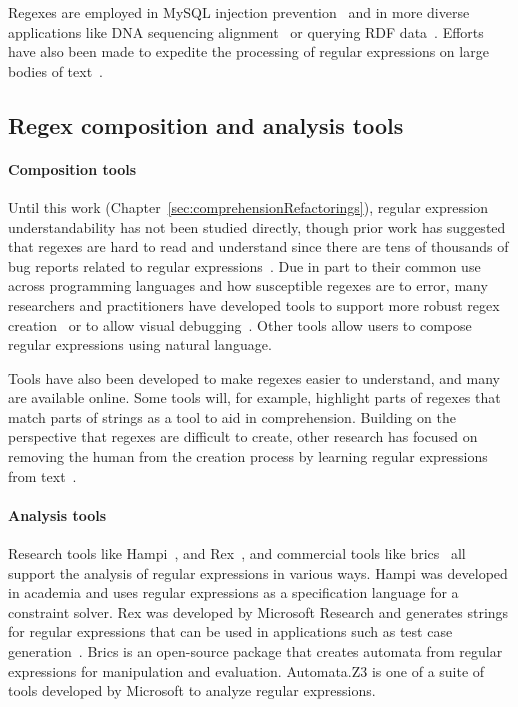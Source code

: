Regexes are employed in MySQL injection prevention~\cite{Yeole:2011:ADT:1980022.1980229} and in more diverse applications like DNA sequencing alignment~\cite{1594922} or querying RDF data~\cite{Lee:2010:PSQ:1871871.1871877, Alkhateeb:2009:ESR:1540656.1540975}.  Efforts have also been made to expedite the processing of regular expressions on large bodies of text~\cite{Baeza-Yates:1996:FTS:235809.235810}.

\subsection{Regex composition and analysis tools}
\paragraph{Composition tools} Until this work (Chapter~\ref{sec:comprehensionRefactorings}), regular expression understandability has not been studied directly, though prior work has suggested that regexes are hard to read and understand since there are tens of thousands of bug reports related to regular expressions~\cite{Spishak:2012:TSR:2318202.2318207}.  Due in part to their common use across programming languages and how susceptible regexes are to error, many researchers and practitioners have developed tools to support more robust regex creation~\cite{Spishak:2012:TSR:2318202.2318207} or to allow visual debugging~\cite{Beck:2014:RVD:2591062.2591111}.  Other tools allow users to compose regular expressions using natural language.

Tools have also been developed to make regexes easier to understand, and many are available online. Some tools will, for example, highlight parts of regexes that match parts of strings as a tool to aid in comprehension.  Building on the perspective that regexes are difficult to create, other research has focused on removing the human from the creation process by learning regular expressions from  text~\cite{Babbar:2010:CBA:1871840.1871848, Li:2008:REL:1613715.1613719}.

\paragraph{Analysis tools} Research tools like Hampi~\cite{hampi}, and Rex~\cite{rex}, and commercial tools like brics~\cite{brics} all support the analysis of regular expressions in various ways. Hampi was developed  in academia and uses regular expressions as a specification language for a constraint solver. Rex was developed by Microsoft Research and generates strings for regular expressions that can be used in  applications such as test case generation~\cite{Anand:2013:OSM:2503903.2503991, Tillmann:2014:TAT:2642937.2642941}. Brics is an open-source package that creates automata from regular expressions for manipulation and evaluation. Automata.Z3 is one of a suite of tools developed by Microsoft to analyze regular expressions.
